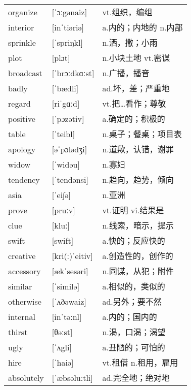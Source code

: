 \documentclass[a4paper]{article}
\begin{document}
\section{}
\begin{tabular}{l l l}

organize & [ˈɔːgənaiz] & vt.组织，编组 \\
interior & [inˈtiəriə] & a.内的；内地的 n.内部 \\
sprinkle & [ˈspriŋkl] & n.洒，撒；小雨 \\
plot & [plɔt] & n.小块土地 vt.密谋 \\
broadcast & [ˈbrɔːdkɑːst] & n.广播，播音 \\
badly & [ˈbædli] & ad.坏，差；严重地 \\
regard & [riˈgɑːd] & vt.把…看作；尊敬 \\
positive & [ˈpɔzətiv] & a.确定的；积极的 \\
table & [ˈteibl] & n.桌子；餐桌；项目表 \\
apology & [əˈpɔlədʒi] & n.道歉，认错，谢罪 \\
widow & [ˈwidəu] & n.寡妇 \\
tendency & [ˈtendənsi] & n.趋向，趋势，倾向 \\
asia & [ˈei∫ə] & n.亚洲 \\
prove & [pruːv] & vt.证明 vi.结果是 \\
clue & [kluː] & n.线索，暗示，提示 \\
swift & [swift] & a.快的；反应快的 \\
creative & [kri(ː)ˈeitiv] & a.创造性的，创作的 \\
accessory & [ækˈsesəri] & n.同谋，从犯；附件 \\
similar & [ˈsimilə] & a.相似的，类似的 \\
otherwise & [ˈʌðəwaiz] & ad.另外；要不然 \\
internal & [inˈtəːnl] & a.内的；国内的 \\
thirst & [θəːst] & n.渴，口渴；渴望 \\
ugly & [ˈʌgli] & a.丑陋的；可怕的 \\
hire & [ˈhaiə] & vt.租借 n.租用，雇用 \\
absolutely & [ˈæbsəluːtli] & ad.完全地；绝对地 \\

\end{tabular}
\end{document}
